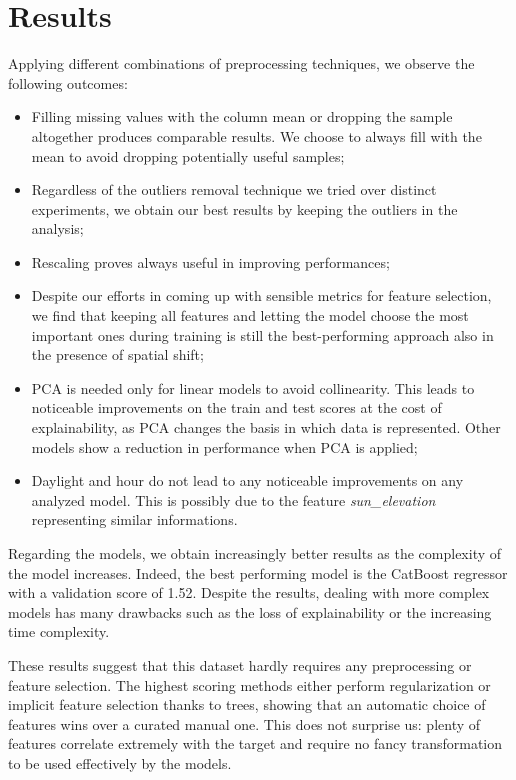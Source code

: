 \documentclass{article}
\begin{document}
\section{Results}
Applying different combinations of preprocessing techniques, we observe the following outcomes:

\begin{itemize} 
    \item Filling missing values with the column mean or dropping the sample altogether produces comparable results. We choose to always fill with the mean to avoid dropping potentially useful samples;
    \item Regardless of the outliers removal technique we tried over distinct experiments, we obtain our best results by keeping the outliers in the analysis;
    \item Rescaling proves always useful in improving performances;
    \item Despite our efforts in coming up with sensible metrics for feature selection, we find that keeping all features and letting the model choose the most important ones during training is still the best-performing approach also in the presence of spatial shift;
    \item PCA is needed only for linear models to avoid collinearity. This leads to noticeable improvements on the train and test scores at the cost of explainability, as PCA changes the basis in which data is represented. Other models show a reduction in performance when PCA is applied;
    \item Daylight and hour do not lead to any noticeable improvements on any analyzed model. This is possibly due to the feature \textit{sun\_elevation} representing similar informations.
\end{itemize} 

Regarding the models, we obtain increasingly better results as the complexity of the model increases. Indeed, the best performing model is the CatBoost regressor with a validation score of 1.52. Despite the results, dealing with more complex models has many drawbacks such as the loss of explainability or the increasing time complexity.

These results suggest that this dataset hardly requires any preprocessing or feature selection. The highest scoring methods either perform regularization or implicit feature selection thanks to trees, showing that an automatic choice of features wins over a curated manual one. This does not surprise us: plenty of features correlate extremely with the target and require no fancy transformation to be used effectively by the models.
\end{document}

